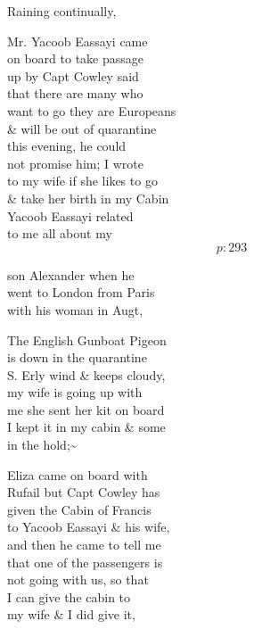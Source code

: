 \documentclass{report}
\begin{document}
	\par{
 	Raining continually,\ \\
	}

	\par{
 	Mr. Yacoob Eassayi came\ \\on board to take passage\ \\up by Capt Cowley said\ \\that there are many who\ \\want to go they are Europeans\ \\\& will be out of quarantine\ \\this evening, he could\ \\not promise him; I wrote\ \\to my wife if she likes to go\ \\\& take her birth in my Cabin\ \\Yacoob Eassayi related\ \\to me all about my\ \\
  \[p: 293 \]

	}





	\par{
 	son Alexander when he\ \\went to London from Paris\ \\with his woman in Augt,\ \\
	}

	\par{
 	The English Gunboat Pigeon\ \\is down in the quarantine\ \\S. Erly wind \& keeps cloudy,\ \\my wife is going up with\ \\me she sent her kit on board\ \\I kept it in my cabin \& some\ \\in the hold;\~{}\ \\
	}

	\par{
 	Eliza came on board with\ \\Rufail but Capt Cowley has\ \\given the Cabin of Francis\ \\to Yacoob Eassayi \& his wife,\ \\and then he came to tell me\ \\that one of the passengers is\ \\not going with us, so that\ \\I can give the cabin to\ \\my wife \& I did give it,\ \\
	}
\end{document}
